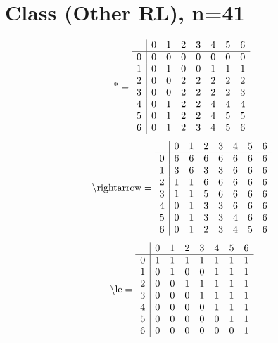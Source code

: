 \documentclass[11pt]{article}
\begin{document}
\section{Class (Other RL), n=41}
\[\text{*} = 
\begin{array}{r | r r r r r r r}
 & 0 & 1 & 2 & 3 & 4 & 5 & 6 \\ \hline
0 & 0 & 0 & 0 & 0 & 0 & 0 & 0 \\
1 & 0 & 1 & 0 & 0 & 1 & 1 & 1 \\
2 & 0 & 0 & 2 & 2 & 2 & 2 & 2 \\
3 & 0 & 0 & 2 & 2 & 2 & 2 & 3 \\
4 & 0 & 1 & 2 & 2 & 4 & 4 & 4 \\
5 & 0 & 1 & 2 & 2 & 4 & 5 & 5 \\
6 & 0 & 1 & 2 & 3 & 4 & 5 & 6 \\
\end{array}
\]
\[\text{\textbackslash rightarrow} = 
\begin{array}{r | r r r r r r r}
 & 0 & 1 & 2 & 3 & 4 & 5 & 6 \\ \hline
0 & 6 & 6 & 6 & 6 & 6 & 6 & 6 \\
1 & 3 & 6 & 3 & 3 & 6 & 6 & 6 \\
2 & 1 & 1 & 6 & 6 & 6 & 6 & 6 \\
3 & 1 & 1 & 5 & 6 & 6 & 6 & 6 \\
4 & 0 & 1 & 3 & 3 & 6 & 6 & 6 \\
5 & 0 & 1 & 3 & 3 & 4 & 6 & 6 \\
6 & 0 & 1 & 2 & 3 & 4 & 5 & 6 \\
\end{array}
\]
\[\text{\textbackslash le} = 
\begin{array}{r | r r r r r r r}
 & 0 & 1 & 2 & 3 & 4 & 5 & 6 \\ \hline
0 & 1 & 1 & 1 & 1 & 1 & 1 & 1 \\
1 & 0 & 1 & 0 & 0 & 1 & 1 & 1 \\
2 & 0 & 0 & 1 & 1 & 1 & 1 & 1 \\
3 & 0 & 0 & 0 & 1 & 1 & 1 & 1 \\
4 & 0 & 0 & 0 & 0 & 1 & 1 & 1 \\
5 & 0 & 0 & 0 & 0 & 0 & 1 & 1 \\
6 & 0 & 0 & 0 & 0 & 0 & 0 & 1 \\
\end{array}
\]
\end{document}
